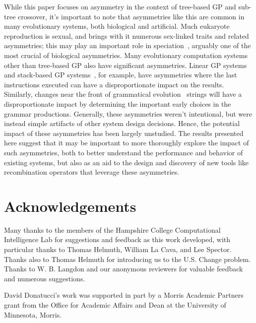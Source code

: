 \documentclass{sig-alternate}
\begin{document}
While this paper focuses on asymmetry in the context of tree-based GP and sub-tree crossover, it's important to note
that asymmetries like this are common in many evolutionary systems, both biological and artificial. Much eukaryote
reproduction is sexual, and brings with it numerous sex-linked traits and related asymmetries; this may play an
important role in speciation~\cite{qvarnstrom2009speciation}, arguably one of the most crucial of biological
asymmetries. Many evolutionary computation systems other than tree-based GP also have significant asymmetries. Linear
GP systems~\cite{brameier2007linear} and stack-based GP systems~\cite{spector:2002:GPEM}, for example, have asymmetries
where the last instructions executed can have a disproportionate impact on the results. Similarly, changes near the
front of grammatical evolution~\cite{o2003grammatical} strings will have a disproportionate impact by determining the
important early choices in the grammar productions. Generally, these asymmetries weren't intentional, but
were instead simple artifacts of other system design decisions. Hence, the potential impact of these asymmetries has
been largely unstudied. The results presented here suggest that it may be important to more thoroughly explore the
impact of such asymmetries, both to better understand the performance and behavior of existing systems, but also as an
aid to the design and discovery of new tools like recombination operators that leverage these asymmetries.

 \section*{Acknowledgements}

 Many thanks to the members of the Hampshire College Computational Intelligence Lab for suggestions and feedback as
 this work developed, with particular thanks to Thomas Helmuth, William La Cava, and Lee Spector. Thanks also to Thomas
 Helmuth for introducing us to the U.S. Change problem. Thanks to W. B. Langdon and our anonymous reviewers 
 for valuable feedback and numerous suggestions. 
 
 David Donatucci's work was supported in part by a Morris Academic Partners grant from the Office for Academic Affairs and Dean at the University of Minnesota, Morris.



\end{document}
